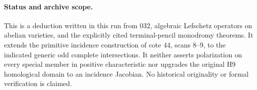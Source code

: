 \paragraph{Status and archive scope.}
This is a deduction written in this run from 032, algebraic Lefschetz
operators on abelian varieties, and the explicitly cited terminal-pencil
monodromy theorems. It extends the primitive incidence construction of
cote 44, scans 8--9, to the indicated generic odd complete intersections.
It neither asserts polarization on every special member in positive
characteristic nor upgrades the original H9 homological domain to an
incidence Jacobian. No historical originality or formal verification
is claimed.
